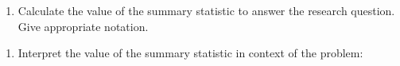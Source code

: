 \documentclass[
]{report}
\providecommand{\tightlist}{%
  \setlength{\itemsep}{0pt}\setlength{\parskip}{0pt}}
\begin{document}
\begin{enumerate}
\def\labelenumi{\alph{enumi}.}
\setcounter{enumi}{4}
\tightlist
\item
  Calculate the value of the summary statistic to answer the research question. Give appropriate notation.
\end{enumerate}

\vspace{0.4in}

\begin{enumerate}
\def\labelenumi{\alph{enumi}.}
\setcounter{enumi}{5}
\tightlist
\item
  Interpret the value of the summary statistic in context of the problem:
\end{enumerate}

\vspace{0.3in}
\end{document}
